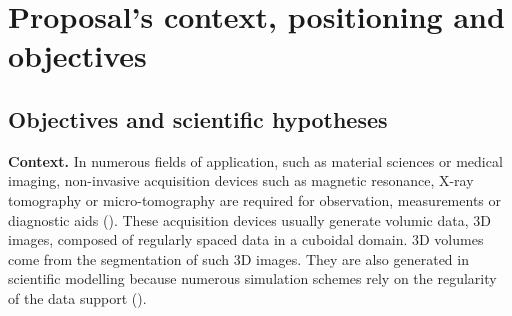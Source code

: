 \section{Proposal's context, positioning and objectives}
\label{sec:context}

\subsection{Objectives and scientific hypotheses}
\label{sec:goals}


\noindent\textbf{Context.}
In numerous fields of application, such as material sciences
or medical imaging, non-invasive acquisition devices such as magnetic
resonance, X-ray tomography or micro-tomography are required for
observation, measurements or diagnostic aids
(\eg \cite{Hildebrand1999,dcoeurjo_flin_ImPro}). %
These acquisition devices usually generate volumic data, \ie
3D images, composed of regularly spaced data in a cuboidal domain.
3D volumes come from the segmentation of such 3D images.
They are also generated in scientific modelling because
numerous simulation schemes rely on the regularity of the data support
(\eg \cite{wojtan2007animating,jones2010directable,marechal2010heat}).



